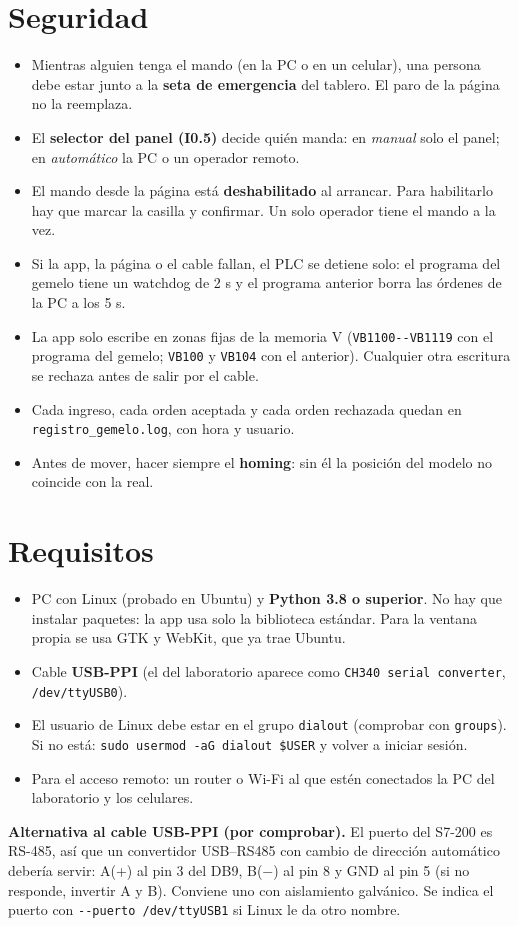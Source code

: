 \documentclass[a4paper,11pt]{article}
\newcommand{\codigo}[1]{\texttt{#1}}
\newcommand{\nota}[1]{\par\smallskip\noindent\colorbox{gris}{\parbox{\dimexpr\linewidth-2\fboxsep}{#1}}\par\smallskip}
\begin{document}
\section{Seguridad}
\begin{itemize}
\item Mientras alguien tenga el mando (en la PC o en un celular), una persona debe estar junto a la \textbf{seta de emergencia} del tablero. El paro de la página no la reemplaza.
\item El \textbf{selector del panel (I0.5)} decide quién manda: en \emph{manual} solo el panel; en \emph{automático} la PC o un operador remoto.
\item El mando desde la página está \textbf{deshabilitado} al arrancar. Para habilitarlo hay que marcar la casilla y confirmar. Un solo operador tiene el mando a la vez.
\item Si la app, la página o el cable fallan, el PLC se detiene solo: el programa del gemelo tiene un watchdog de 2 s y el programa anterior borra las órdenes de la PC a los 5 s.
\item La app solo escribe en zonas fijas de la memoria V (\codigo{VB1100-{}-VB1119} con el programa del gemelo; \codigo{VB100} y \codigo{VB104} con el anterior). Cualquier otra escritura se rechaza antes de salir por el cable.
\item Cada ingreso, cada orden aceptada y cada orden rechazada quedan en \codigo{registro\_gemelo.log}, con hora y usuario.
\item Antes de mover, hacer siempre el \textbf{homing}: sin él la posición del modelo no coincide con la real.
\end{itemize}

\section{Requisitos}
\begin{itemize}
\item PC con Linux (probado en Ubuntu) y \textbf{Python 3.8 o superior}. No hay que instalar paquetes: la app usa solo la biblioteca estándar. Para la ventana propia se usa GTK y WebKit, que ya trae Ubuntu.
\item Cable \textbf{USB-PPI} (el del laboratorio aparece como \codigo{CH340 serial converter}, \codigo{/dev/ttyUSB0}).
\item El usuario de Linux debe estar en el grupo \codigo{dialout} (comprobar con \codigo{groups}). Si no está: \codigo{sudo usermod -aG dialout \$USER} y volver a iniciar sesión.
\item Para el acceso remoto: un router o Wi-Fi al que estén conectados la PC del laboratorio y los celulares.
\end{itemize}
\nota{\textbf{Alternativa al cable USB-PPI (por comprobar).} El puerto del S7-200 es RS-485, así que un convertidor USB--RS485 con cambio de dirección automático debería servir: A(+) al pin 3 del DB9, B($-$) al pin 8 y GND al pin 5 (si no responde, invertir A y B). Conviene uno con aislamiento galvánico. Se indica el puerto con \codigo{-{}-puerto /dev/ttyUSB1} si Linux le da otro nombre.}
\end{document}
